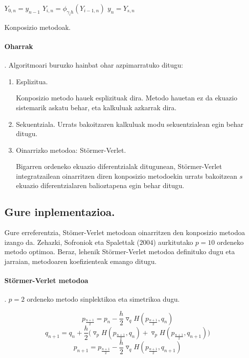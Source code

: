 \begin{algorithm}[H]
 \BlankLine
  {
   \BlankLine
    $Y_{0,n}=y_{n-1} $\;
    \BlankLine
   {
    \BlankLine 
    $Y_{i,n}=\phi_{\gamma_i h}(Y_{i-1,n})$\;
   }
   \BlankLine
    $y_{n}=Y_{s,n}$\;
   \BlankLine
 }
 \caption{Konposizio metodoak.}
\end{algorithm}
 
\paragraph*{Oharrak}.
Algoritmoari buruzko hainbat ohar azpimarratuko ditugu:
\begin{enumerate}
\item{Esplizitua.}

Konposizio metodo hauek esplizituak dira. Metodo hauetan ez da ekuazio sistemarik askatu behar, eta kalkuluak azkarrak dira. 

\item{Sekuentziala.}
Urrats bakoitzaren kalkuluak modu sekuentzialean egin behar ditugu.

\item{Oinarrizko metodoa: Störmer-Verlet.}

Bigarren ordeneko ekuazio diferentzialak ditugunean, Störmer-Verlet integratzailean oinarritzen diren konposizio metodoekin
urrats bakoitzean $s$ ekuazio diferentzialaren balioztapena egin behar ditugu.

\end{enumerate}

\subsection{Gure inplementazioa.}

Gure erreferentzia, Stömer-Verlet metodoan oinarritzen den konposizio metodoa izango da. Zehazki, Sofroniok eta Spalettak ($2004$) aurkitutako $p=10$ ordeneko metodo optimoa. Beraz, lehenik Störmer-Verlet metodoa definituko dugu eta jarraian, metodoaren koefizienteak emango ditugu.   

\paragraph*{\textbf{Störmer-Verlet  metodoa}}.
$p=2$ ordeneko metodo sinplektikoa eta simetrikoa dugu.

\[p_{\frac{n+1}{2}}=p_n-\frac{h}{2} \triangledown_q H(p_{\frac{n+1}{2}},q_n) \]
\begin{equation}
q_{n+1}=q_n+\frac{h}{2} \big(\triangledown_p H(p_{\frac{n+1}{2}},q_n)+ \triangledown_p H(p_{\frac{n+1}{2}},q_{n+1}) \big)
\end{equation}
\[p_{n+1}=p_{\frac{n+1}{2}}-\frac{h}{2} \triangledown_q H(p_{\frac{n+1}{2}},q_{n+1}) \]

